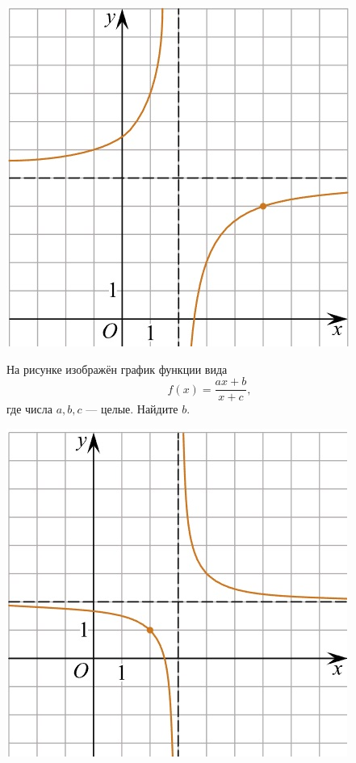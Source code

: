 \begin{class}[number=10]
\begin{listofex}
\begin{minipage}[t]{\picwidth}
			\includegraphics[align=t, width=\linewidth]{../../pics/G101M4C6-6.jpg}
		\end{minipage}
		\item
		\begin{minipage}[t]{\bodywidth}
			На рисунке изображён график функции вида \[ f(x)=\dfrac{ax+b}{x+c}, \] где числа \(a, b, c\) --- целые. Найдите \(b\).
		\end{minipage}
		\hspace{0.02\linewidth}
		\begin{minipage}[t]{\picwidth}
			\includegraphics[align=t, width=\linewidth]{../../pics/G101M4C6-7.jpg}

\end{minipage}
\end{listofex}
\end{class}
